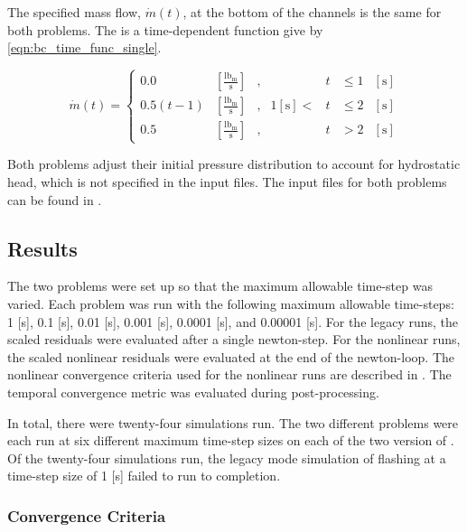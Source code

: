 The specified mass flow, $\dot{m}(t)$, at the bottom of the channels is the same for both problems. 
The is a time-dependent function give by \eqref{eqn:bc_time_func_single}.

\begin{equation}
\label{eqn:bc_time_func_single}
\dot{m}(t) = \left\{
\begin{array}{cclrcll}
 0.0           & [\frac{\text{lb}_{\text{m}}}{\text{s}}] & , &         & t & \leq 1 &[\text{s}] \\
 0.5 ( t - 1)  & [\frac{\text{lb}_{\text{m}}}{\text{s}}] & , & 1 [\text{s}] < & t & \leq 2 &[\text{s}] \\
 0.5           & [\frac{\text{lb}_{\text{m}}}{\text{s}}] & , &         & t & > 2    &[\text{s}]
\end{array}\right.
\end{equation}

Both problems adjust their initial pressure distribution to account for hydrostatic head, which is not specified in the input files.
The \cobra{} input files for both problems can be found in .

\subsection{Results}
\label{subsect:results}

The two problems were set up so that the maximum allowable time-step was varied.
Each problem was run with the following maximum allowable time-steps: 1 [s], 0.1 [s], 0.01 [s], 0.001 [s], 0.0001 [s], and 0.00001 [s]. 
For the legacy runs, the scaled residuals were evaluated after a single newton-step.
For the nonlinear runs, the scaled nonlinear residuals were evaluated at the end of the newton-loop.
The nonlinear convergence criteria used for the nonlinear runs are described in .
The temporal convergence metric was evaluated during post-processing.

In total, there were twenty-four simulations run.
The two different problems were each run at six different maximum time-step sizes on each of the two version of \cobra.
Of the twenty-four simulations run, the legacy mode simulation of flashing at a time-step size of 1 [s] failed to run to completion.

\subsubsection{Convergence Criteria}
\label{sect:result_temporal_convergence}

